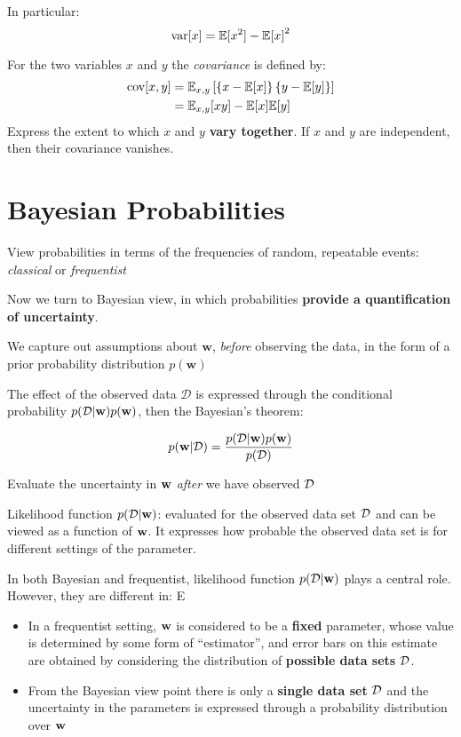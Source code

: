 In particular:
\begin{equation}
    \mbox{var}[x] = \mathbb{E}[x^2] - {\mathbb{E}[x]}^2
    \label{var-x}
\end{equation}

For the two variables $x$ and $y$ the \emph{covariance} is defined by:
\begin{align}
    \mbox{cov}[x,y] &= \mathbb{E}_{x,y}\left[ \left\{ x - \mathbb{E}[x] \right\}\left\{
    y-\mathbb{E}[y] \right\}\right] \\
    &= \mathbb{E}_{x,y}[xy] - \mathbb{E}[x]\mathbb{E}[y]
\end{align}
Express the extent to which $x$ and $y$ \textbf{vary together}.
If $x$ and $y$ are independent, then their covariance vanishes.
\section{Bayesian Probabilities}
View probabilities in terms of the frequencies of random, repeatable
events: \emph{classical} or \emph{frequentist}

Now we turn to Bayesian view, in which probabilities \textbf{provide a
quantification of uncertainty}.

We capture out assumptions about $\mathbf{w}$, \emph{before} observing
the data, in the form of a prior probability distribution $p(\mathbf{w})$

The effect of the observed data $\mathcal{D}$ is expressed through the
conditional probability $p(\mathcal{D}|\mathbf{w})p(\mathbf{w})$, then the Bayesian's theorem:

\begin{equation}
    p(\mathbf{w}|\mathcal{D}) = \frac{p(\mathcal{D}|\mathbf{w})p(\mathbf{w})}{p(\mathcal{D})}
    \label{bayes}
\end{equation}

Evaluate the uncertainty in $\mathbf{w}$ \emph{after} we have observed $\mathcal{D}$

Likelihood function $p(\mathcal{D}|\mathbf{w})$: evaluated for the observed data set
$\mathcal{D}$ and can be viewed as a function of $\mathbf{w}$. It expresses how
probable the observed data set is for different settings of the parameter.

In both Bayesian and frequentist, likelihood function $p(\mathcal{D}|\mathbf{w})$ plays
a central role. However, they are different in:
E\begin{itemize}
    \item In a frequentist setting, $\mathbf{w}$ is considered to be a
        \textbf{fixed} parameter, whose value is determined by some form
        of ``estimator'', and error bars on this estimate are obtained by
        considering the distribution of \textbf{possible data sets}
        $\mathcal{D}$.
    \item From the Bayesian view point there is only a \textbf{single data
        set} $\mathcal{D}$ and the uncertainty in the parameters is expressed
        through a probability distribution over $\mathbf{w}$
\end{itemize}

